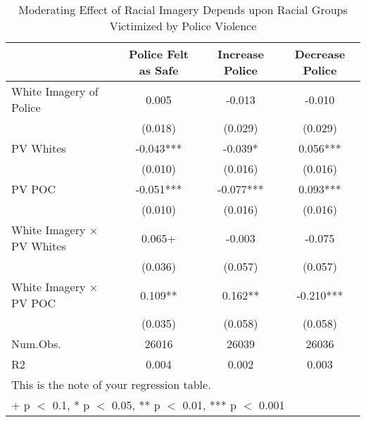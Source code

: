 \begin{table}

\caption{Moderating Effect of Racial Imagery Depends upon Racial Groups Victimized by Police Violence}
\centering
\begin{tabular}[t]{lccc}
\toprule
  & Police Felt as Safe & Increase Police & Decrease Police\\
\midrule
White Imagery of Police & 0.005 & -0.013 & -0.010\\
 & (0.018) & (0.029) & (0.029)\\
PV Whites & -0.043*** & -0.039* & 0.056***\\
 & (0.010) & (0.016) & \vphantom{1} (0.016)\\
PV POC & -0.051*** & -0.077*** & 0.093***\\
 & (0.010) & (0.016) & (0.016)\\
White Imagery × PV Whites & 0.065+ & -0.003 & -0.075\\
 & (0.036) & (0.057) & (0.057)\\
White Imagery × PV POC & 0.109** & 0.162** & -0.210***\\
 & (0.035) & (0.058) & (0.058)\\
\midrule
Num.Obs. & 26016 & 26039 & 26036\\
R2 & 0.004 & 0.002 & 0.003\\
\bottomrule
\multicolumn{4}{l}{\rule{0pt}{1em}This is the note of your regression table.}\\
\multicolumn{4}{l}{\rule{0pt}{1em}+ p $<$ 0.1, * p $<$ 0.05, ** p $<$ 0.01, *** p $<$ 0.001}\\
\end{tabular}
\end{table}
